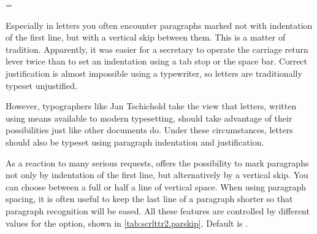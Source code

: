 \begin{Declaration}
  =
\end{Declaration}%
%
\begin{Explain}%
  Especially in letters you often encounter paragraphs marked not with
  indentation of the first line, but with a vertical skip between
  them. This is a matter of tradition. Apparently, it was easier for a
  secretary to operate the carriage return lever twice than to set an
  indentation using a tab stop or the space bar. Correct justification
  is almost impossible using a typewriter, so letters are
  traditionally typeset unjustified.

  However, typographers like Jan Tschichold take the view that
  letters, written using means available to modern typesetting, should
  take advantage of their possibilities just like other documents
  do. Under these circumstances, letters should also be typeset using
  paragraph indentation and justification.
\end{Explain}

As a reaction to many serious requests,  offers the
possibility to mark paragraphs not only by indentation of the first
line, but alternatively by a vertical skip. You can choose between a
full or half a line of vertical space. When using paragraph spacing,
it is often useful to keep the last line of a paragraph shorter so
that paragraph recognition will be eased. All these features are
controlled by different values for the  option, shown
in \autoref{tab:scrlttr2.parskip}. Default is .

